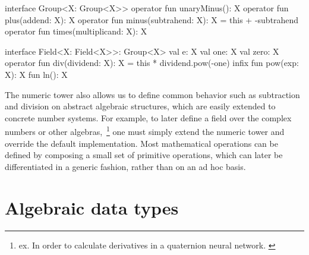 \documentclass[12pt,initial,twoside,maitrise]{dms}
\numberwithin{equation}{section}
\numberwithin{table}{chapter}
\numberwithin{figure}{chapter}
\begin{document}
\begin{kotlinlisting}[caption={Most mathematical operations are composed of a small set of simple operators.}]
interface Group<X: Group<X>> {
    operator fun unaryMinus(): X
    operator fun plus(addend: X): X
    operator fun minus(subtrahend: X): X = this + -subtrahend
    operator fun times(multiplicand: X): X
}

interface Field<X: Field<X>>: Group<X> {
    val e: X
    val one: X
    val zero: X
    operator fun div(dividend: X): X = this * dividend.pow(-one)
    infix fun pow(exp: X): X
    fun ln(): X
}
\end{kotlinlisting}
%
The numeric tower also allows us to define common behavior such as subtraction and division on abstract algebraic structures, which are easily extended to concrete number systems. For example, to later define a field over the complex numbers or other algebras,~\footnote{ex. In order to calculate derivatives in a quaternion neural network. \citep{isokawa2003quaternion}} one must simply extend the numeric tower and override the default implementation. Most mathematical operations can be defined by composing a small set of primitive operations, which can later be differentiated in a generic fashion, rather than on an ad hoc basis.

\section{Algebraic data types}\label{sec:adts}
\end{document}

